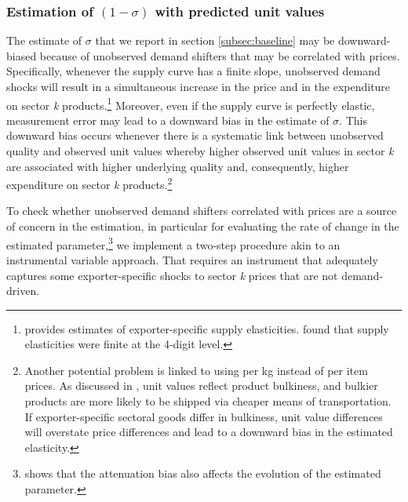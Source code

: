 \documentclass[12pt,twoside,a4paper,notitlepage]{article}
\begin{document}
\subsubsection{Estimation of $(1-\sigma)$ with predicted unit values }


The estimate of $\sigma$ that we report in section \ref{subsec:baseline} may be downward-biased because of unobserved demand shifters that may be correlated with prices.
Specifically, whenever the supply curve has a finite slope, unobserved demand shocks will result in a simultaneous increase in the price and in the expenditure on sector \textit{k} products.\footnote{\cite{Soderbery2018} provides estimates of exporter-specific supply elasticities. \cite{Broda2006} found that supply elasticities were finite at the 4-digit level.} 
Moreover, even if the supply curve is perfectly elastic, measurement error may lead to a downward bias in the estimate of $\sigma$.
This downward bias occurs whenever there is a systematic link between unobserved quality and observed unit values whereby higher observed unit values in sector \textit{k} are associated with higher underlying quality and, consequently, higher expenditure on sector \textit{k} products.\footnote{Another potential problem is linked to using per kg instead of per item prices.
As discussed in \cite{Hummels2013}, unit values reflect product bulkiness, and bulkier products are more likely to be shipped via cheaper means of transportation.
If exporter-specific sectoral goods differ in bulkiness, unit value differences will overstate price differences and lead to a downward bias in the estimated elasticity.} 

To check whether unobserved demand shifters correlated with prices are a source of concern in the estimation, in particular for evaluating the rate of change in the estimated parameter,\footnote{\cite{Feenstra1994} shows that the attenuation bias also affects the evolution of the estimated parameter.} we implement a two-step procedure akin to an instrumental variable approach.
That requires an instrument that adequately captures some exporter-specific shocks to sector \textit{k} prices that are not demand-driven.
\end{document}
